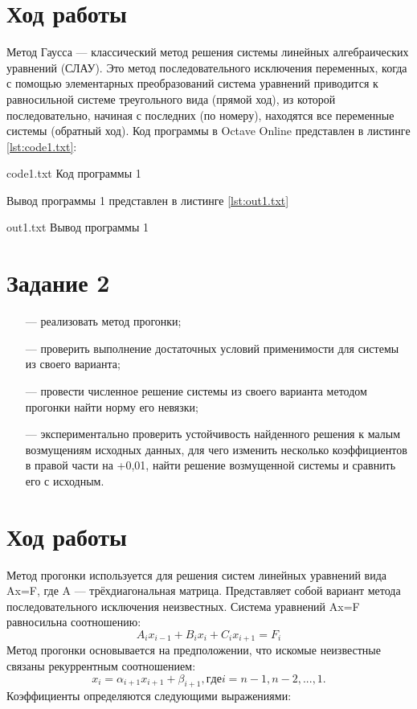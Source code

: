 \documentclass{bmstu}
\begin{document}
\section*{Ход работы}
Метод Гаусса --- классический метод решения системы линейных алгебраических
уравнений (СЛАУ). Это метод последовательного исключения переменных, когда с
помощью элементарных преобразований система уравнений приводится к равносильной
системе треугольного вида (прямой ход), из которой последовательно, начиная с последних
(по номеру), находятся все переменные системы (обратный ход).
Код программы в Octave Online представлен в листинге \ref{lst:code1.txt}:

\newpage
{}
    {code1.txt}
    {Код программы 1}

Вывод программы 1 представлен в листинге \ref{lst:out1.txt}

    {out1.txt}
    {Вывод программы 1}


\newpage
\section*{Задание 2}
\begin{enumerate}
\item[---] реализовать метод прогонки;
\item[---] проверить выполнение достаточных условий применимости для системы из своего
варианта;
\item[---] провести численное решение системы из своего варианта методом прогонки найти
норму его невязки;
\item[---] экспериментально проверить устойчивость найденного решения к малым
возмущениям исходных данных, для чего изменить несколько коэффициентов в правой
части на +0,01, найти решение возмущенной системы и сравнить его с исходным.
\end{enumerate}

\section*{Ход работы}
Метод прогонки используется для решения систем линейных уравнений вида Ax=F,
где A --- трёхдиагональная матрица. Представляет собой вариант метода последовательного
исключения неизвестных.
Система уравнений Ax=F равносильна соотношению:
\[A_ix_{i-1} + B_ix_i + C_ix_{i+1} = F_i \]
Метод прогонки основывается на предположении, что искомые неизвестные связаны
рекуррентным соотношением:
\[x_i = \alpha_{i+1}x_{i+1} + \beta_{i+1} , где i = n-1, n-2, ..., 1.\]
Коэффициенты определяются следующими выражениями:
\end{document}
